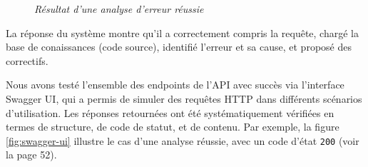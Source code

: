 \documentclass[12pt,a4paper]{report}
\begin{document}
	\begin{figure}[H]
		\centering
		\caption{\textit{Résultat d'une analyse d'erreur réussie}}
		\label{fig:premier-test}
	\end{figure}
	
	La réponse du système montre qu'il a correctement compris la requête, chargé la base de conaissances (code source), identifié l'erreur et sa cause, et proposé des correctifs. 
	
	Nous avons testé l'ensemble des endpoints de l'API avec succès via l'interface Swagger UI, qui a permis de simuler des requêtes HTTP dans différents scénarios d'utilisation. Les réponses retournées ont été systématiquement vérifiées en termes de structure, de code de statut, et de contenu. Par exemple, la figure \ref{fig:swagger-ui} illustre le cas d'une analyse réussie, avec un code d'état \verb|200| (voir la page 52).
	
\end{document}
